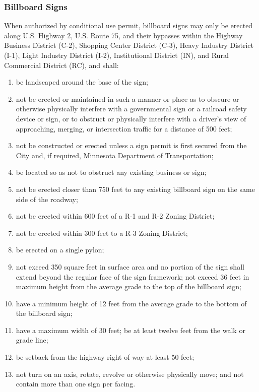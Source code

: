 \subsubsection{Billboard Signs}
When authorized by conditional use permit, billboard signs may only be erected along U.S. Highway 2, U.S. Route 75, and their bypasses within the Highway Business District (C-2), Shopping Center District (C-3), Heavy Industry District (I-1), Light Industry District (I-2), Institutional District (IN), and Rural Commercial District (RC), and shall:
\begin{enumerate}[{\indent}a)]
    \item be landscaped around the base of the sign;
    \item not be erected or maintained in such a manner or place as to obscure or otherwise physically interfere with a governmental sign or a railroad safety device or sign, or to obstruct or physically interfere with a driver’s view of approaching, merging, or intersection traffic for a distance of 500 feet;
    \item not be constructed or erected unless a sign permit is first secured from the City and, if required, Minnesota Department of Transportation; 
    \item be located so as not to obstruct any existing business or sign; 
    \item not be erected closer than 750 feet to any existing billboard sign on the same side of the roadway;
    \item not be erected within 600 feet of a R-1 and R-2 Zoning District; 
    \item not be erected within 300 feet to a R-3 Zoning District; 
    \item be erected on a single pylon; 
    \item not exceed 350 square feet in surface area and no portion of the sign shall extend beyond the regular face of the sign framework; not exceed 36 feet in maximum height from the average grade to the top of the billboard sign; 
    \item have a minimum height of 12 feet from the average grade to the bottom of the billboard sign; 
    \item have a maximum width of 30 feet; be at least twelve feet from the walk or grade line; 
    \item be setback from the highway right of way at least 50 feet; 
    \item not turn on an axis, rotate, revolve or otherwise physically move; and not contain more than one sign per facing.
\end{enumerate}
